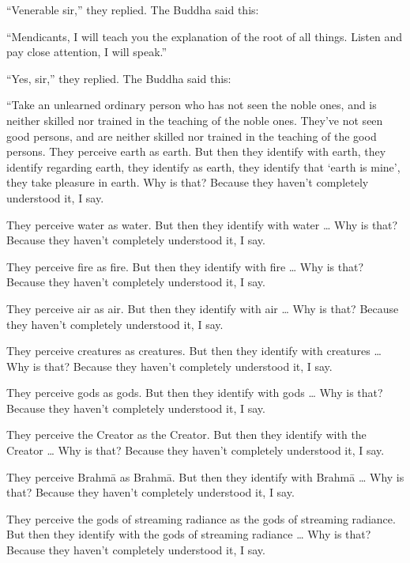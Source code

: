 \documentclass[12pt,openany]{book}%
\begin{document}
“Venerable sir,” they replied. The Buddha said this: 

“Mendicants, I will teach you the explanation of the root of all things. Listen and pay close attention, I will speak.” 

“Yes, sir,” they replied. The Buddha said this: 

“Take an unlearned ordinary person who has not seen the noble ones, and is neither skilled nor trained in the teaching of the noble ones. They’ve not seen good persons, and are neither skilled nor trained in the teaching of the good persons. They perceive earth as earth. But then they identify with earth, they identify regarding earth, they identify as earth, they identify that ‘earth is mine’, they take pleasure in earth. Why is that? Because they haven’t completely understood it, I say. 

They perceive water as water. But then they identify with water … Why is that? Because they haven’t completely understood it, I say. 

They perceive fire as fire. But then they identify with fire … Why is that? Because they haven’t completely understood it, I say. 

They perceive air as air. But then they identify with air … Why is that? Because they haven’t completely understood it, I say. 

They perceive creatures as creatures. But then they identify with creatures … Why is that? Because they haven’t completely understood it, I say. 

They perceive gods as gods. But then they identify with gods … Why is that? Because they haven’t completely understood it, I say. 

They perceive the Creator as the Creator. But then they identify with the Creator … Why is that? Because they haven’t completely understood it, I say. 

They perceive \textsanskrit{Brahmā} as \textsanskrit{Brahmā}. But then they identify with \textsanskrit{Brahmā} … Why is that? Because they haven’t completely understood it, I say. 

They perceive the gods of streaming radiance as the gods of streaming radiance. But then they identify with the gods of streaming radiance … Why is that? Because they haven’t completely understood it, I say. 
\end{document}
